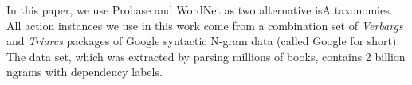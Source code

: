 In this paper, we use Probase\cite{WuLWZ12} and WordNet\cite{wordnet}
as two alternative isA taxonomies.
All action instances we use in this work come
from a combination set of 
{\em Verbargs} and {\em Triarcs} packages of Google syntactic N-gram
data\cite{goldberg2013,googlengram} (called Google for short).
The data set, which was extracted by parsing millions of books,
contains 2 billion ngrams with dependency labels.

